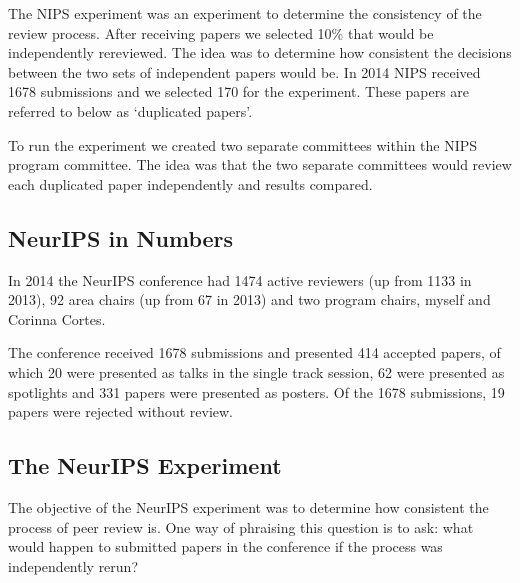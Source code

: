 \documentclass[a4paperpaper,]{article}
\begin{document}



The NIPS experiment was an experiment to determine the consistency of
the review process. After receiving papers we selected 10\% that would
be independently rereviewed. The idea was to determine how consistent
the decisions between the two sets of independent papers would be. In
2014 NIPS received 1678 submissions and we selected 170 for the
experiment. These papers are referred to below as `duplicated papers'.

To run the experiment we created two separate committees within the NIPS
program committee. The idea was that the two separate committees would
review each duplicated paper independently and results compared.

\hypertarget{neurips-in-numbers}{%
\subsection{NeurIPS in Numbers}\label{neurips-in-numbers}}

\begin{flushright}
\end{flushright}

In 2014 the NeurIPS conference had 1474 active reviewers (up from 1133
in 2013), 92 area chairs (up from 67 in 2013) and two program chairs,
myself and Corinna Cortes.

The conference received 1678 submissions and presented 414 accepted
papers, of which 20 were presented as talks in the single track session,
62 were presented as spotlights and 331 papers were presented as
posters. Of the 1678 submissions, 19 papers were rejected without
review.

\hypertarget{the-neurips-experiment}{%
\subsection{The NeurIPS Experiment}\label{the-neurips-experiment}}

The objective of the NeurIPS experiment was to determine how consistent
the process of peer review is. One way of phraising this question is to
ask: what would happen to submitted papers in the conference if the
process was independently rerun?
\end{document}

